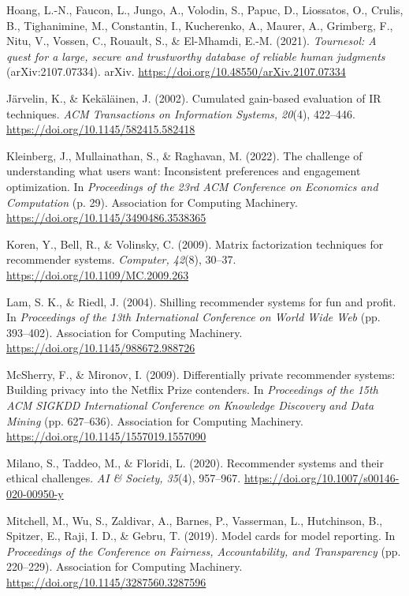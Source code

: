 \documentclass[11pt,letterpaper]{article}
\newenvironment{references}
  {\par\small\raggedright\setlength{\parskip}{3pt plus 1pt}\setlength{\parindent}{0pt}}
  {\par}
\newcommand{\refentry}{\par\noindent\hangindent=0.3in\hangafter=1\relax}
\begin{document}
\begin{references}
\refentry Hoang, L.-N., Faucon, L., Jungo, A., Volodin, S., Papuc, D., Liossatos, O., Crulis, B., Tighanimine,
M., Constantin, I., Kucherenko, A., Maurer, A., Grimberg, F., Nitu, V., Vossen, C., Rouault, S., \& El-Mhamdi,
E.-M. (2021). \textit{Tournesol: A quest for a large, secure and trustworthy database of reliable human
judgments} (arXiv:2107.07334). arXiv. \url{https://doi.org/10.48550/arXiv.2107.07334}

\refentry Järvelin, K., \& Kekäläinen, J. (2002). Cumulated gain-based evaluation of IR techniques.
\textit{ACM Transactions on Information Systems, 20}(4), 422--446. \url{https://doi.org/10.1145/582415.582418}

\refentry Kleinberg, J., Mullainathan, S., \& Raghavan, M. (2022). The challenge of understanding what users
want: Inconsistent preferences and engagement optimization. In \textit{Proceedings of the 23rd ACM Conference
on Economics and Computation} (p. 29). Association for Computing Machinery.
\url{https://doi.org/10.1145/3490486.3538365}

\refentry Koren, Y., Bell, R., \& Volinsky, C. (2009). Matrix factorization techniques for recommender
systems. \textit{Computer, 42}(8), 30--37. \url{https://doi.org/10.1109/MC.2009.263}

\refentry Lam, S. K., \& Riedl, J. (2004). Shilling recommender systems for fun and profit. In
\textit{Proceedings of the 13th International Conference on World Wide Web} (pp. 393--402). Association for
Computing Machinery. \url{https://doi.org/10.1145/988672.988726}

\refentry McSherry, F., \& Mironov, I. (2009). Differentially private recommender systems: Building privacy
into the Netflix Prize contenders. In \textit{Proceedings of the 15th ACM SIGKDD International Conference on
Knowledge Discovery and Data Mining} (pp. 627--636). Association for Computing Machinery.
\url{https://doi.org/10.1145/1557019.1557090}

\refentry Milano, S., Taddeo, M., \& Floridi, L. (2020). Recommender systems and their ethical challenges.
\textit{AI \& Society, 35}(4), 957--967. \url{https://doi.org/10.1007/s00146-020-00950-y}

\refentry Mitchell, M., Wu, S., Zaldivar, A., Barnes, P., Vasserman, L., Hutchinson, B., Spitzer, E., Raji, I.
D., \& Gebru, T. (2019). Model cards for model reporting. In \textit{Proceedings of the Conference on
Fairness, Accountability, and Transparency} (pp. 220--229). Association for Computing Machinery.
\url{https://doi.org/10.1145/3287560.3287596}


\end{references}
\end{document}
